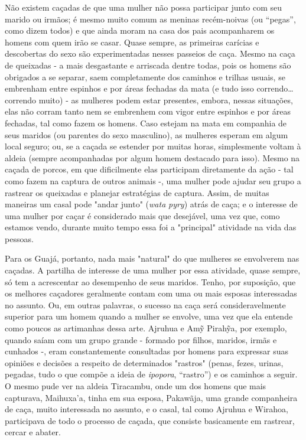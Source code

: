 Não existem caçadas de que uma mulher não possa participar junto com seu
marido ou irmãos; é mesmo muito comum as meninas recém-noivas (ou
``pegas'', como dizem todos) e que ainda moram na casa dos pais
acompanharem os homens com quem irão se casar. Quase sempre, as
primeiras carícias e descobertas do sexo são experimentadas nesses
passeios de caça. Mesmo na caça de queixadas - a mais desgastante e
arriscada dentre todas, pois os homens são obrigados a se separar, saem
completamente dos caminhos e trilhas usuais, se embrenham entre espinhos
e por áreas fechadas da mata (e tudo isso correndo\ldots{} correndo muito) -
as mulheres podem estar presentes, embora, nessas situações, elas não
corram tanto nem se embrenhem com vigor entre espinhos e por áreas
fechadas, tal como fazem os homens. Caso estejam na mata em companhia de
seus maridos (ou parentes do sexo masculino), as mulheres esperam em
algum local seguro; ou, se a caçada se estender por muitas horas,
simplesmente voltam à aldeia (sempre acompanhadas por algum homem
destacado para isso). Mesmo na caçada de porcos, em que dificilmente
elas participam diretamente da ação - tal como fazem na captura de
outros animais -, uma mulher pode ajudar seu grupo a rastrear os
queixadas e planejar estratégias de captura. Assim, de muitas maneiras
um casal pode "andar junto" (\emph{wata} \emph{pyry}) atrás de caça; e o
interesse de uma mulher por caçar é considerado mais que desejável, uma
vez que, como estamos vendo, durante muito tempo essa foi a "principal"
atividade na vida das pessoas.

Para os Guajá, portanto, nada mais "natural" do que mulheres se
envolverem nas caçadas. A partilha de interesse de uma mulher por essa
atividade, quase sempre, só tem a acrescentar ao desempenho de seus
maridos. Tenho, por suposição, que os melhores caçadores geralmente
contam com uma ou mais esposas interessadas no assunto. Ou, em outras
palavras, o sucesso na caça será consideravelmente superior para um
homem quando a mulher se envolve, uma vez que ela entende como poucos as
artimanhas dessa arte. Ajruhua e Amỹ Pirahỹa, por exemplo, quando saíam
com um grupo grande - formado por filhos, maridos, irmãs e cunhados -,
eram constantemente consultadas por homens para expressar suas opiniões
e decisões a respeito de determinados "rastros" (penas, fezes, urinas,
pegadas, tudo o que compõe a ideia de \emph{ipopora}, ``rastro'') e os
caminhos a seguir. O mesmo pude ver na aldeia Tiracambu, onde um dos
homens que mais capturava, Maihuxa'a, tinha em sua esposa, Pakawãja, uma
grande companheira de caça, muito interessada no assunto, e o casal, tal
como Ajruhua e Wirahoa, participava de todo o processo de caçada, que
consiste basicamente em rastrear, cercar e abater.

